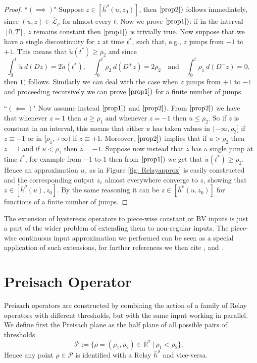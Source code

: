 \documentclass[12pt]{article}
\newcommand{\R}{\mathbb{R}}
\newcommand{\PP}{\mathcal{P}}
\newcommand{\p}{\rho}
\newcommand{\1}{\mathds{1}}
\theoremstyle{definition}
\begin{document}
\begin{proof}
    ``$(\implies)$" Suppose $z\in[\bar{h}^\p(u,z_0)]$, then $\ref{prop2})$ follows immediately, since $(u,z)\in \bar{\mathcal{L}}_\rho$ for almost every $t$. Now we prove $\ref{prop1})$: if in the interval $[0,T]$, $z$ remains constant then $\ref{prop1})$ is trivially true. Now suppose that we have a single discontinuity for $z$ at time $t^*$, such that, e.g.,  $z$ jumps from $-1$ to $+1$. This means that $\tilde{u}(t^*)\geq \p_2$ and since \[ \int_{0}^{t} \tilde{u} ~d(Dz) = 2 \tilde{u}(t^*),\quad\int_{0}^{t} \p_2 ~d(D^+z) = 2 \p_2 \quad \text{and} \quad\int_{0}^{t} \p_1 ~d(D^-z) = 0,\] then $1)$ follows. Similarly we can deal with the case when $z$ jumps from $+1$ to $-1$ and proceeding recursively we can prove $\ref{prop1})$ for a finite number of jumps. 
    

    ``$(\impliedby )$" Now assume instead $\ref{prop1})$ and $\ref{prop2})$. From $\ref{prop2})$ we have that whenever $z=1$ then $u\geq \p_1$ and whenever $z=-1$ then $u\leq \p_2$. So if $z $ is constant in an interval, this means that either $u$ has taken values in $(-\infty, \p_2]$ if $z\equiv -1$ or in $[ \p_1,+\infty)$ if $z\equiv +1$. Moreover, $\ref{prop2})$ implies that if $u>\p_2$ then $z=1$ and if $u<\p_1$ then $z=-1.$ Suppose now instead that $z$ has a single jump at time $t^*$, for example from $-1$ to $1$ then from $\ref{prop1})$ we get that $\tilde{u}(t^*)\geq \p_2$. Hence an approximation $u_\varepsilon$ as in Figure \ref{fig: Relayapprox} is easily constructed and the corresponding output $z_\varepsilon$ almost everywhere converge to $z$, showing that $z\in [\bar{h}^\p(u),z_0].$  By the same reasoning it can be $z \in [\bar{h}^\p(u,z_0)]$ for functions of a finite number of jumps. 
\end{proof}

The extension of hysteresis operators to piece-wise constant or BV inputs is just a part of the wider problem of extending them to non-regular inputs. The piece-wise continuous input approximation we performed can be seen as a special application of such extensions, for further references we then cite \cite{RF2}, \cite{RF1} and \cite{RV}.



\section{Preisach Operator}\label{S2}

Preisach operators are constructed by combining the action of a family of Relay operators with different thresholds, but with the same input working in parallel. We define first the Preisach plane as the half plane of all possible pairs of thresholds \begin{equation}
    \PP:=\{\p=(\p_1,\p_2)\in \R^2~|~ \p_1<\p_2\}.
\end{equation} Hence any point $\rho\in{\mathcal P}$ is identified with a Relay $\bar{h}^\rho$ and vice-versa. 
\end{document}
